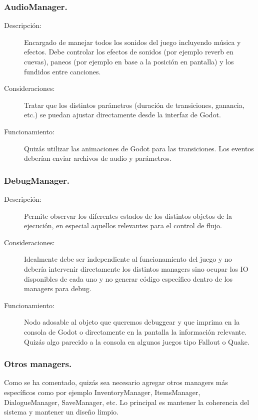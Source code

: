 \subsubsection{AudioManager.}\label{modelado:audiomanager}
\begin{description}
	\item[Descripción:] Encargado de manejar todos los sonidos del juego incluyendo música y efectos. Debe controlar los efectos de sonidos (por ejemplo reverb en cuevas), paneos (por ejemplo en base a la posición en pantalla) y los fundidos entre canciones.
	
	\item[Consideraciones:] Tratar que los distintos parámetros (duración de transiciones, ganancia, etc.) se puedan ajustar directamente desde la interfaz de Godot.
	
	\item[Funcionamiento:] Quizás utilizar las animaciones de Godot para las transiciones. Los eventos deberían enviar archivos de audio y parámetros.
\end{description}
	
\subsubsection{DebugManager.}\label{modelado:debugmanager}
\begin{description}
	\item[Descripción:] Permite observar los diferentes estados de los distintos objetos de la ejecución, en especial aquellos relevantes para el control de flujo.
	
	\item[Consideraciones:] Idealmente debe ser independiente al funcionamiento del juego y no debería intervenir directamente los distintos managers sino ocupar los IO disponibles de cada uno y no generar código específico dentro de los managers para debug.
	
	\item[Funcionamiento:] Nodo adosable al objeto que queremos debuggear y que imprima en la consola de Godot o directamente en la pantalla la información relevante. Quizás algo parecido a la consola en algunos juegos tipo Fallout o Quake.
\end{description}

\subsubsection{Otros managers.}\label{modelado:otros-managers}
Como se ha comentado, quizás sea necesario agregar otros managers más específicos como por ejemplo InventoryManager, ItemsManager, DialogueManager, SaveManager, etc. Lo principal es mantener la coherencia del sistema y mantener un diseño limpio.


